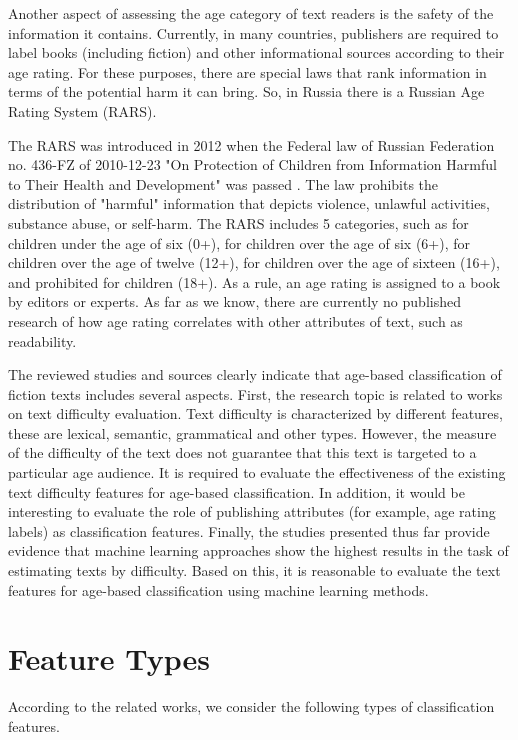 \documentclass[runningheads]{llncs}
\begin{document}
Another aspect of assessing the age category of text readers is the safety of the information it contains. Currently, in many countries, publishers are required to label books (including fiction) and other informational sources \cite{ars3,ars5,ars4,ars2,ars1} according to their age rating. For these purposes, there are special laws that rank information in terms of the potential harm it can bring. So, in Russia there is a Russian Age Rating System (RARS).

The RARS was introduced in 2012 when the Federal law of Russian Federation no. 436-FZ of 2010-12-23 "On Protection of Children from Information Harmful to Their Health and Development" was passed \cite{law}. The law prohibits the distribution of "harmful" information that depicts violence, unlawful activities, substance abuse, or self-harm. The RARS includes 5 categories, such as for children under the age of six (0+), for children over the age of six (6+), for children over the age of twelve (12+), for children over the age of sixteen (16+), and prohibited for children (18+). As a rule, an age rating is assigned to a book by editors or experts. As far as we know, there are currently no published research of how age rating correlates with other attributes of text, such as readability.

The reviewed studies and sources clearly indicate that age-based classification of fiction texts includes several aspects. First, the research topic is related to works on text difficulty evaluation. Text difficulty is characterized by different features, these are lexical, semantic, grammatical and other types. However, the measure of the difficulty of the text does not guarantee that this text is targeted to a particular age audience. It is required to evaluate the effectiveness of the existing text difficulty features for age-based classification. In addition, it would be interesting to evaluate the role of publishing attributes (for example, age rating labels) as classification features. Finally, the studies presented thus far provide evidence that machine learning approaches show the highest results in the task of estimating texts by difficulty. Based on this, it is reasonable to evaluate the text features for age-based classification using machine learning methods.

\section{Feature Types}

According to the related works, we consider the following types of classification features.
\end{document}
